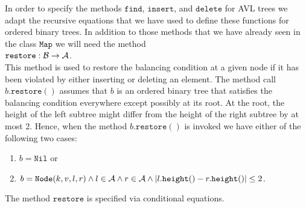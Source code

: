 In order to specify the methods \emph{$\texttt{find}$}, \emph{$\texttt{insert}$}, and \emph{$\texttt{delete}$} for AVL trees we
adapt the recursive equations that we have used to define these functions for ordered binary trees.
In addition to those methods that we have already seen in the class $\texttt{Map}$ we will need the method
\\[0.2cm]
\hspace*{1.3cm} $\texttt{restore}: \mathcal{B} \rightarrow \mathcal{A}$. 
\\[0.2cm]
This method is used to restore the balancing condition at a given node if it has been violated by
either inserting or deleting an element.
The method call $b.\texttt{restore}()$ assumes that  $b$ is an ordered binary tree that satisfies
the balancing condition everywhere except possibly at its root. 
At the root, the height of the left subtree might differ from the height of the right subtree by at
most 2.  Hence, when the method $b.\texttt{restore}()$ is invoked we have either of the following
two cases:
\begin{enumerate}
\item $b = \texttt{Nil}$ \quad or
\item $b = \texttt{Node}(k,v,l,r) \wedge l \in \mathcal{A} \wedge r \in \mathcal{A} \wedge
       |l.\texttt{height}() - r.\texttt{height}()| \leq 2$.
\end{enumerate}
The method $\texttt{restore}$ is specified via conditional equations.
